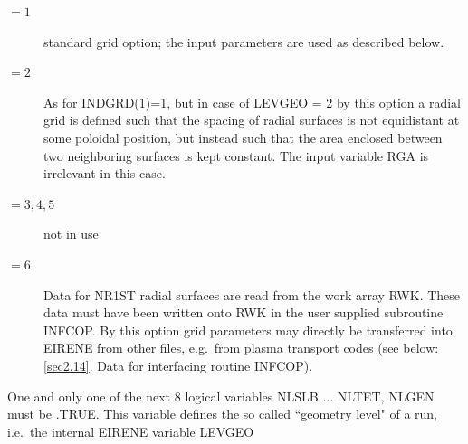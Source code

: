 \begin{description}
        \begin{description}
          \item[$= 1$] standard grid option; the input parameters are
                used as described below.
          \item[$= 2$] As for INDGRD(1)=1, but in case of LEVGEO = 2 by this option a
                radial grid is defined such that the spacing of radial surfaces is not
                equidistant at some poloidal position, but instead such that the area enclosed
                between two neighboring surfaces is kept constant.
                The input variable RGA is irrelevant in this case.
          \item[$= 3, 4, 5$] not in use
          \item[$= 6$] Data for NR1ST radial surfaces are
                read from the work array RWK.
                These data must have been written onto RWK in the user supplied subroutine
                INFCOP.
                By this option grid parameters may directly be transferred into EIRENE from
                other files, e.g.\ from plasma transport codes (see below:
                \cref{sec2.14}.
                Data for interfacing routine INFCOP).
        \end{description}
\end{description}

One and only one of the next 8 logical variables NLSLB $\dots$ NLTET, NLGEN
must be .TRUE.
This variable defines the so called ``geometry level" of a run, i.e.\ the
internal EIRENE variable LEVGEO 

